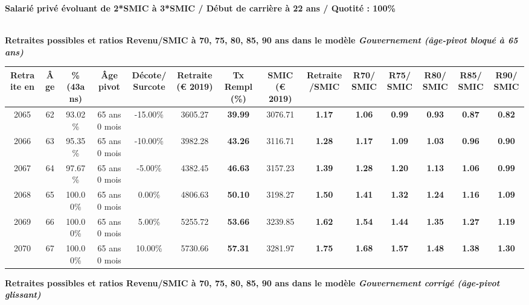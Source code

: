 {\bf \noindent Salarié privé évoluant de 2*SMIC à 3*SMIC / Début de carrière à 22 ans / Quotité : 100\%}  ~ 

 ~\\{\bf \noindent Retraites possibles et ratios Revenu/SMIC à 70, 75, 80, 85, 90 ans dans le modèle \emph{Gouvernement (âge-pivot bloqué à 65 ans)}}  
 
\begin{adjustbox}{max width=\textwidth} 
\begin{tabular}[htb]{|c|c||c|c|c||c|c||c|c||c|c|c|c|c|} 
\hline 
 Retraite en &  Âge &  \%(43ans) &  Âge pivot &  Décote/Surcote &  Retraite (\euro{} 2019) &  Tx Rempl(\%) &  SMIC (\euro{} 2019) &  Retraite/SMIC &  R70/SMIC &  R75/SMIC &  R80/SMIC &  R85/SMIC &  R90/SMIC \\ 
\hline \hline 
 2065 &  62 &  93.02\% &  65 ans 0 mois &  -15.00\% &  3605.27 &  {\bf 39.99} &  3076.71 &  {\bf 1.17} &  {\bf 1.06} &  {\bf {\color{red} 0.99}} &  {\bf {\color{red} 0.93}} &  {\bf {\color{red} 0.87}} &  {\bf {\color{red} 0.82}} \\ 
\hline 
 2066 &  63 &  95.35\% &  65 ans 0 mois &  -10.00\% &  3982.28 &  {\bf 43.26} &  3116.71 &  {\bf 1.28} &  {\bf 1.17} &  {\bf 1.09} &  {\bf 1.03} &  {\bf {\color{red} 0.96}} &  {\bf {\color{red} 0.90}} \\ 
\hline 
 2067 &  64 &  97.67\% &  65 ans 0 mois &  -5.00\% &  4382.45 &  {\bf 46.63} &  3157.23 &  {\bf 1.39} &  {\bf 1.28} &  {\bf 1.20} &  {\bf 1.13} &  {\bf 1.06} &  {\bf {\color{red} 0.99}} \\ 
\hline 
 2068 &  65 &  100.00\% &  65 ans 0 mois &  0.00\% &  4806.63 &  {\bf 50.10} &  3198.27 &  {\bf 1.50} &  {\bf 1.41} &  {\bf 1.32} &  {\bf 1.24} &  {\bf 1.16} &  {\bf 1.09} \\ 
\hline 
 2069 &  66 &  100.00\% &  65 ans 0 mois &  5.00\% &  5255.72 &  {\bf 53.66} &  3239.85 &  {\bf 1.62} &  {\bf 1.54} &  {\bf 1.44} &  {\bf 1.35} &  {\bf 1.27} &  {\bf 1.19} \\ 
\hline 
 2070 &  67 &  100.00\% &  65 ans 0 mois &  10.00\% &  5730.66 &  {\bf 57.31} &  3281.97 &  {\bf 1.75} &  {\bf 1.68} &  {\bf 1.57} &  {\bf 1.48} &  {\bf 1.38} &  {\bf 1.30} \\ 
\hline 
\hline 
\end{tabular} 
\end{adjustbox} 
 
 \vspace{0.1cm} 
{\bf \noindent Retraites possibles et ratios Revenu/SMIC à 70, 75, 80, 85, 90 ans dans le modèle \emph{Gouvernement corrigé (âge-pivot glissant)}}  
 
